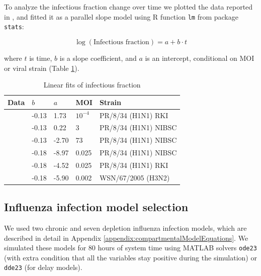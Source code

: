 To analyze the infectious fraction change over time we plotted the data reported in \cite{rudiger2019multiscale, schulze2009infection}, and fitted it as a parallel slope model using R function \texttt{lm} from package \texttt{stats}:

\begin{equation}
\log(\text{Infectious fraction}) = a + b \cdot t
\end{equation}

where $t$ is time, $b$ is a slope coefficient, and $a$ is an intercept, conditional on MOI \cite{rudiger2019multiscale} or viral strain \cite{schulze2009infection} (Table \ref{table:linearFitsInfectiousFraction}).

\begin{table}[h!]
\centering
\caption[Linear fits of infectious fraction]{Linear fits of infectious fraction}
\label{table:linearFitsInfectiousFraction}

\begin{tabular}{p{2cm} p{2cm} p{2cm} p{2cm} p{4cm}}
\hline 
\textbf{Data} & $b$ & $a$ &  \textbf{MOI} & \textbf{Strain}\\
\hline
\cite{rudiger2019multiscale} & -0.13 & 1.73 & $10^{-4}$ & PR/8/34 (H1N1) RKI\\
\cite{rudiger2019multiscale} & -0.13 & 0.22 & 3 & PR/8/34 (H1N1) NIBSC\\
\cite{rudiger2019multiscale} & -0.13 & -2.70 & 73 & PR/8/34 (H1N1) NIBSC\\
\hline
\cite{schulze2009infection} & -0.18 & -8.97 & 0.025 & PR/8/34 (H1N1) NIBSC\\
\cite{schulze2009infection} & -0.18 & -4.52 & 0.025 & PR/8/34 (H1N1) RKI\\
\cite{schulze2009infection} & -0.18 & -5.90 & 0.002 & WSN/67/2005 (H3N2)\\
\hline
\end{tabular}
\end{table}

\subsection{Influenza infection model selection}

We used two chronic and seven depletion influenza infection models, which are described in detail in Appendix \ref{appendix:compartmentalModelEquations}. We simulated these models for 80 hours of  system time using MATLAB solvers \texttt{ode23} (with extra condition that all the variables stay positive during the simulation) or \texttt{dde23} (for delay models).

